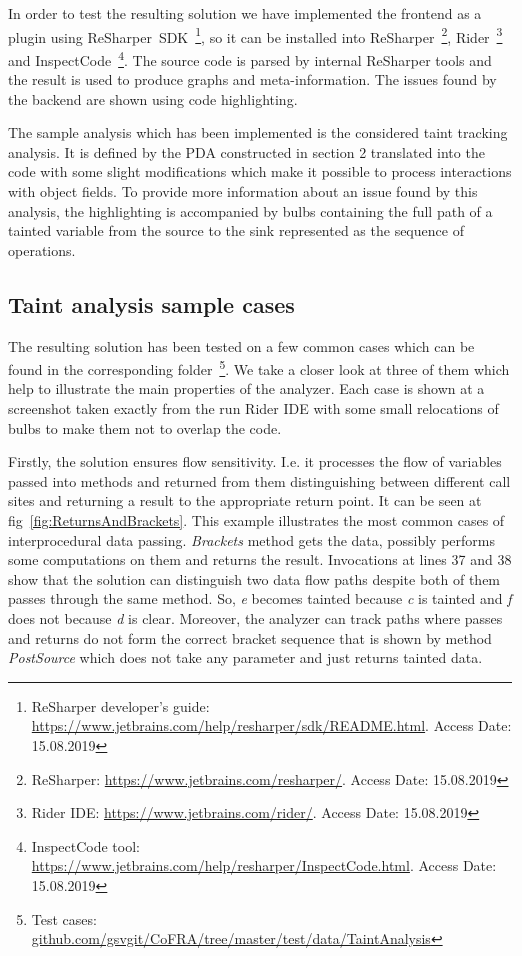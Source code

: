 In order to test the resulting solution we have implemented the frontend as a plugin using ReSharper~SDK~\footnote{ReSharper developer's guide: \url{https://www.jetbrains.com/help/resharper/sdk/README.html}. Access Date: 15.08.2019}, so it can be installed into ReSharper~\footnote{ReSharper: \url{https://www.jetbrains.com/resharper/}. Access Date: 15.08.2019}, Rider~\footnote{Rider IDE: \url{https://www.jetbrains.com/rider/}. Access Date: 15.08.2019} and InspectCode~\footnote{InspectCode tool: \url{https://www.jetbrains.com/help/resharper/InspectCode.html}. Access Date: 15.08.2019}.
The source code is parsed by internal ReSharper tools and the result is used to produce graphs and meta-information.
The issues found by the backend are shown using code highlighting.

The sample analysis which has been implemented is the considered taint tracking analysis.
It is defined by the PDA constructed in section 2 translated into the code with some slight modifications which make it possible to process interactions with object fields.
To provide more information about an issue found by this analysis, the highlighting is accompanied by bulbs containing the full path of a tainted variable from the source to the sink represented as the sequence of operations.

\subsection{Taint analysis sample cases}

The resulting solution has been tested on a few common cases which can be found in the corresponding folder~\footnote{Test cases: \url{github.com/gsvgit/CoFRA/tree/master/test/data/TaintAnalysis}}.
We take a closer look at three of them which help to illustrate the main properties of the analyzer.
Each case is shown at a screenshot taken exactly from the run Rider IDE with some small relocations of bulbs to make them not to overlap the code.

Firstly, the solution ensures flow sensitivity. I.e. it processes the flow of variables passed into methods and returned from them distinguishing between different call sites and returning a result to the appropriate return point.
It can be seen at fig~\ref{fig:ReturnsAndBrackets}.
This example illustrates the most common cases of interprocedural data passing.
\textit{Brackets} method gets the data, possibly performs some computations on them and returns the result.
Invocations at lines 37 and 38 show that the solution can distinguish two data flow paths despite both of them passes through the same method.
So, \textit{e} becomes tainted because \textit{c} is tainted and \textit{f} does not because \textit{d} is clear.
Moreover, the analyzer can track paths where passes and returns do not form the correct bracket sequence that is shown by method \textit{PostSource} which does not take any parameter and just returns tainted data.

